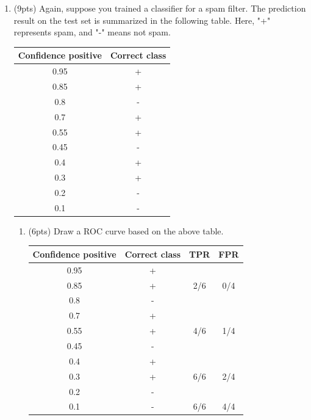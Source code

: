 \documentclass[a4paper]{article}
\theoremstyle{definition}
\newenvironment{soln}{
    \leavevmode\color{blue}\ignorespaces
}{}
\begin{document}
\begin{enumerate}
\item (9pts) Again, suppose you trained a classifier for a spam filter. The prediction result on the test set is summarized in the following table. Here, "+" represents spam, and "-" means not spam.

\begin{center}
\begin{tabular}{ c  c }
\hline
Confidence positive & Correct class \\ \hline
0.95 & + \\
0.85 & + \\
0.8 & - \\
0.7 & + \\
0.55 & + \\
0.45 & - \\
0.4 & + \\
0.3 & + \\
0.2 & - \\
0.1 & - \\
\hline
\end{tabular}
\end{center}

\begin{enumerate}
	\item (6pts) Draw a ROC curve based on the above table.
	
	\begin{soln}
		\begin{center}
			\begin{tabular}{ c  c  c  c }
				\hline
				Confidence positive & Correct class & TPR & FPR \\ \hline
				0.95 & + \\
				0.85 & + & 2/6 & 0/4 \\ \hline
				0.8 & - \\
				0.7 & + \\
				0.55 & + & 4/6 & 1/4 \\ \hline
				0.45 & - \\
				0.4 & + \\
				0.3 & + & 6/6 & 2/4 \\ \hline
				0.2 & - \\
				0.1 & - & 6/6 & 4/4 \\
				\hline
			\end{tabular}
		\end{center}
	\end{soln}
	

\end{enumerate}
\end{enumerate}
\end{document}
